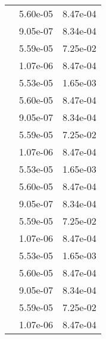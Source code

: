 \begin{table}
\begin{tabular}{c|cc|}
\multicolumn{1}{|c|}{} & \multicolumn{1}{|c|}{  5.60e-05} & \multicolumn{1}{|c|}{  8.47e-04} \\ 
\multicolumn{1}{|c|}{} & \multicolumn{1}{|c|}{  9.05e-07} & \multicolumn{1}{|c|}{  8.34e-04} \\ 
\multicolumn{1}{|c|}{} & \multicolumn{1}{|c|}{  5.59e-05} & \multicolumn{1}{|c|}{  7.25e-02} \\ 
\multicolumn{1}{|c|}{} & \multicolumn{1}{|c|}{  1.07e-06} & \multicolumn{1}{|c|}{  8.47e-04} \\ 
\multicolumn{1}{|c|}{} & \multicolumn{1}{|c|}{  5.53e-05} & \multicolumn{1}{|c|}{  1.65e-03} \\ 
\multicolumn{1}{|c|}{} & \multicolumn{1}{|c|}{  5.60e-05} & \multicolumn{1}{|c|}{  8.47e-04} \\ 
\multicolumn{1}{|c|}{} & \multicolumn{1}{|c|}{  9.05e-07} & \multicolumn{1}{|c|}{  8.34e-04} \\ 
\multicolumn{1}{|c|}{} & \multicolumn{1}{|c|}{  5.59e-05} & \multicolumn{1}{|c|}{  7.25e-02} \\ 
\multicolumn{1}{|c|}{} & \multicolumn{1}{|c|}{  1.07e-06} & \multicolumn{1}{|c|}{  8.47e-04} \\ 
\multicolumn{1}{|c|}{} & \multicolumn{1}{|c|}{  5.53e-05} & \multicolumn{1}{|c|}{  1.65e-03} \\ 
\multicolumn{1}{|c|}{} & \multicolumn{1}{|c|}{  5.60e-05} & \multicolumn{1}{|c|}{  8.47e-04} \\ 
\multicolumn{1}{|c|}{} & \multicolumn{1}{|c|}{  9.05e-07} & \multicolumn{1}{|c|}{  8.34e-04} \\ 
\multicolumn{1}{|c|}{} & \multicolumn{1}{|c|}{  5.59e-05} & \multicolumn{1}{|c|}{  7.25e-02} \\ 
\multicolumn{1}{|c|}{} & \multicolumn{1}{|c|}{  1.07e-06} & \multicolumn{1}{|c|}{  8.47e-04} \\ 
\multicolumn{1}{|c|}{} & \multicolumn{1}{|c|}{  5.53e-05} & \multicolumn{1}{|c|}{  1.65e-03} \\ 
\multicolumn{1}{|c|}{} & \multicolumn{1}{|c|}{  5.60e-05} & \multicolumn{1}{|c|}{  8.47e-04} \\ 
\multicolumn{1}{|c|}{} & \multicolumn{1}{|c|}{  9.05e-07} & \multicolumn{1}{|c|}{  8.34e-04} \\ 
\multicolumn{1}{|c|}{} & \multicolumn{1}{|c|}{  5.59e-05} & \multicolumn{1}{|c|}{  7.25e-02} \\ 
\multicolumn{1}{|c|}{} & \multicolumn{1}{|c|}{  1.07e-06} & \multicolumn{1}{|c|}{  8.47e-04} \\ 

\end{tabular}
\end{table}
